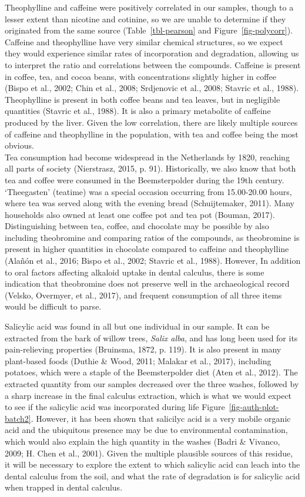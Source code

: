 \documentclass[
  letterpaper,
]{book}
\begin{document}
Theophylline and caffeine were positively correlated in our samples,
though to a lesser extent than nicotine and cotinine, so we are unable
to determine if they originated from the same source
(Table~\ref{tbl-pearson} and Figure~\ref{fig-polycorr}). Caffeine and
theophylline have very similar chemical structures, so we expect they
would experience similar rates of incorporation and degradation,
allowing us to interpret the ratio and correlations between the
compounds. Caffeine is present in coffee, tea, and cocoa beans, with
concentrations slightly higher in coffee (Bispo et al., 2002; Chin et
al., 2008; Srdjenovic et al., 2008; Stavric et al., 1988). Theophylline
is present in both coffee beans and tea leaves, but in negligible
quantities (Stavric et al., 1988). It is also a primary metabolite of
caffeine produced by the liver. Given the low correlation, there are
likely multiple sources of caffeine and theophylline in the population,
with tea and coffee being the most obvious.\\
Tea consumption had become widespread in the Netherlands by 1820,
reaching all parts of society (Nierstrasz, 2015, p. 91). Historically,
we also know that both tea and coffee were consumed in the
Beemsterpolder during the 19th century. `Theegasten' (teatime) was a
special occasion occurring from 15.00-20.00 hours, where tea was served
along with the evening bread (Schuijtemaker, 2011). Many households also
owned at least one coffee pot and tea pot (Bouman, 2017). Distinguishing
between tea, coffee, and chocolate may be possible by also including
theobromine and comparing ratios of the compounds, as theobromine is
present in higher quantities in chocolate compared to caffeine and
theophylline (Alañón et al., 2016; Bispo et al., 2002; Stavric et al.,
1988). However, In addition to oral factors affecting alkaloid uptake in
dental calculus, there is some indication that theobromine does not
preserve well in the archaeological record (Velsko, Overmyer, et al.,
2017), and frequent consumption of all three items would be difficult to
parse.

Salicylic acid was found in all but one individual in our sample. It can
be extracted from the bark of willow trees, \emph{Salix alba}, and has
long been used for its pain-relieving properties (Bruinsma, 1872, p.
119). It is also present in many plant-based foods (Duthie \& Wood,
2011; Malakar et al., 2017), including potatoes, which were a staple of
the Beemsterpolder diet (Aten et al., 2012). The extracted quantity from
our samples decreased over the three washes, followed by a sharp
increase in the final calculus extraction, which is what we would expect
to see if the salicylic acid was incorporated during life
Figure~\ref{fig-auth-plot-batch2}. However, it has been shown that
salicilyc acid is a very mobile organic acid and the ubiquitous presence
may be due to environmental contamination, which would also explain the
high quantity in the washes (Badri \& Vivanco, 2009; H. Chen et al.,
2001). Given the multiple plausible sources of this residue, it will be
necessary to explore the extent to which salicylic acid can leach into
the dental calculus from the soil, and what the rate of degradation is
for salicylic acid when trapped in dental calculus.
\end{document}
